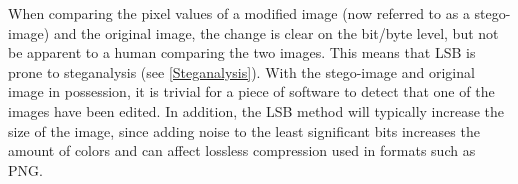 When comparing the pixel values of a modified image (now referred to as a stego-image) and the original image, the change is clear on the bit/byte level, but not be apparent to a human comparing the two images. This means that LSB is prone to steganalysis (see \autoref{Steganalysis}). With the stego-image and original image in possession, it is trivial for a piece of software to detect that one of the images have been edited. In addition, the LSB method will typically increase the size of the image, since adding noise to the least significant bits increases the amount of colors and can affect lossless compression used in formats such as PNG.